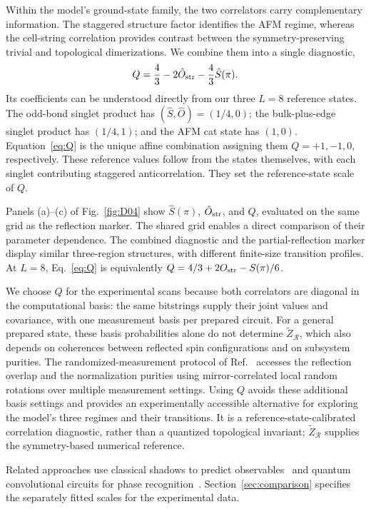 Within the model's ground-state family, the two correlators carry complementary information.
The staggered structure factor identifies the AFM regime, whereas the cell-string correlation provides contrast between the symmetry-preserving trivial and topological dimerizations.
We combine them into a single diagnostic,
\begin{equation}
Q=\frac43-2\hat O_{\rm str}-\frac43\hat S(\pi).
\label{eq:Q}
\end{equation}
Its coefficients can be understood directly from our three $L=8$ reference states.
The odd-bond singlet product has $(\hat S,\hat O)=(1/4,0)$; the bulk-plus-edge singlet product has $(1/4,1)$; and the AFM cat state has $(1,0)$.
Equation~\eqref{eq:Q} is the unique affine combination assigning them $Q=+1,-1,0$, respectively.
These reference values follow from the states themselves, with each singlet contributing staggered anticorrelation.
They set the reference-state scale of $Q$.

Panels (a)--(c) of Fig.~\ref{fig:D04} show $\hat S(\pi)$, $\hat O_{\rm str}$, and $Q$, evaluated on the same grid as the reflection marker.
The shared grid enables a direct comparison of their parameter dependence.
The combined diagnostic and the partial-reflection marker display similar three-region structures, with different finite-size transition profiles.
At $L=8$, Eq.~\eqref{eq:Q} is equivalently $Q=4/3+2O_{\rm str}-S(\pi)/6$.

We choose $Q$ for the experimental scans because both correlators are diagonal in the computational basis: the same bitstrings supply their joint values and covariance, with one measurement basis per prepared circuit.
For a general prepared state, these basis probabilities alone do not determine $\tilde Z_{\mathcal R}$, which also depends on coherences between reflected spin configurations and on subsystem purities.
The randomized-measurement protocol of Ref.~\cite{elben2020manybody} accesses the reflection overlap and the normalization purities using mirror-correlated local random rotations over multiple measurement settings.
Using $Q$ avoids these additional basis settings and provides an experimentally accessible alternative for exploring the model's three regimes and their transitions.
It is a reference-state-calibrated correlation diagnostic, rather than a quantized topological invariant; $\tilde Z_{\mathcal R}$ supplies the symmetry-based numerical reference.

Related approaches use classical shadows to predict observables~\cite{huang2020predicting} and quantum convolutional circuits for phase recognition~\cite{cong2019quantum}.
Section~\ref{sec:comparison} specifies the separately fitted scales for the experimental data.
